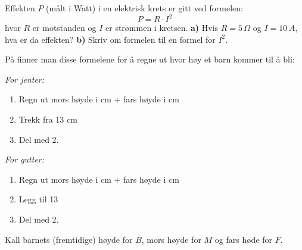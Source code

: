 \begin{comment}
\op{frm4}
Formelen for BMI (Body Mass Index) ser slik ut:
\[ \text{BMI}=\frac{m}{h^2} \]
hvor $ m $ betyr en persons vekt (i kg) og $ h $ er personens høyde (i meter).\os

\textbf{a)} Hvis en person har $ {\text{BMI}=29} $ og er 2\,m høy, hvor mye veier da personen?\os
\textbf{b)} Hvis en person har $ {\text{BMI}=23} $ og veier 75\,kg, hvor høy er personen?\os
{\small 
\obs BMI er et mål som er lagd for å studere relasjonen mellom vekt og høyde \textsl{for store folkegrupper}. Det kan være interessant å vite hva BMI-en til 1000 mennesker er, men BMI-en til enkeltmennesker sier svært lite om personen. For eksempel blir både Aksel Lund Svindal og Ragnhild Mowinckel, to av Norges best trente atleter, definert som overvektige på BMI-skalaen.
\begin{center}
\texttt{[image: aksel]}
\texttt{[image: rag]}
\end{center}
Vi har brukt BMI-en til enkeltpersoner i oppgaven fordi det gir oss øving i formelregning.}
\end{comment}
Effekten $ P $ (målt i Watt) i en elektrisk krets er gitt ved formelen:
\[ P=R\cdot I^2 \]
hvor $ R $ er motstanden og $ I $ er strømmen i kretsen.\os
\textbf{a)} Hvis $ {R=5\,\Omega} $ og $ {I=10\,A} $, hva er da effekten?\os
\textbf{b)} Skriv om formelen til en formel for $ I^2 $.

På
 finner man disse formelene for å regne ut hvor høy et barn kommer til å bli:\os

\textit{For jenter:}
\begin{enumerate}
	\item Regn ut mors høyde i cm + fars høyde i cm
	\item Trekk fra 13 cm
	\item Del med 2.
\end{enumerate}

\textit{For gutter:}
\begin{enumerate}
	\item Regn ut mors høyde i cm + fars høyde i cm
	\item Legg til 13 
	\item Del med 2.
\end{enumerate}
Kall barnets (fremtidige) høyde for $ B $, mors høyde for $ M $ og fars høde for $ F $.

